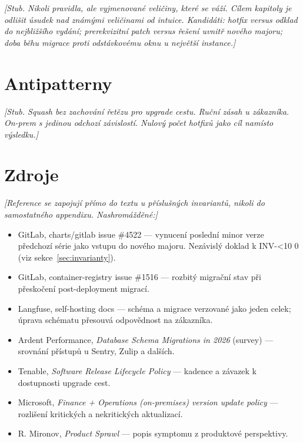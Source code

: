 \documentclass[11pt,a4paper]{article}
\newcounter{invariant}
\renewcommand{\theinvariant}{INV-\ifnum\value{invariant}<10 0\fi\arabic{invariant}}
\begin{document}
\emph{[Stub. Nikoli pravidla, ale vyjmenované veličiny, které se váží.
Cílem kapitoly je odlišit úsudek nad známými veličinami od intuice.
Kandidáti: hotfix versus odklad do nejbližšího vydání; prerekvizitní
patch versus řešení uvnitř nového majoru; doba běhu migrace proti
odstávkovému oknu u největší instance.]}

\section{Antipatterny}
\label{sec:antipatterny}

\emph{[Stub. Squash bez zachování řetězu pro upgrade cestu. Ruční zásah
u zákazníka. On-prem s jedinou odchozí závislostí. Nulový počet hotfixů
jako cíl namísto výsledku.]}

\section*{Zdroje}

\emph{[Reference se zapojují přímo do textu u příslušných invariantů,
nikoli do samostatného appendixu. Nashromážděné:]}

\begin{itemize}[leftmargin=1.4em]
\item GitLab, charts/gitlab issue \#4522 --- vynucení poslední minor verze
      předchozí série jako vstupu do nového majoru. Nezávislý doklad
      k \theinvariant{} (viz sekce~\ref{sec:invarianty}).
\item GitLab, container-registry issue \#1516 --- rozbitý migrační stav
      při přeskočení post-deployment migrací.
\item Langfuse, self-hosting docs --- schéma a migrace verzované jako
      jeden celek; úprava schématu přesouvá odpovědnost na zákazníka.
\item Ardent Performance, \emph{Database Schema Migrations in 2026}
      (survey) --- srovnání přístupů u Sentry, Zulip a dalších.
\item Tenable, \emph{Software Release Lifecycle Policy} --- kadence
      a závazek k dostupnosti upgrade cest.
\item Microsoft, \emph{Finance + Operations (on-premises) version update
      policy} --- rozlišení kritických a nekritických aktualizací.
\item R. Mironov, \emph{Product Sprawl} --- popis symptomu z produktové
      perspektivy.
\end{itemize}
\end{document}
